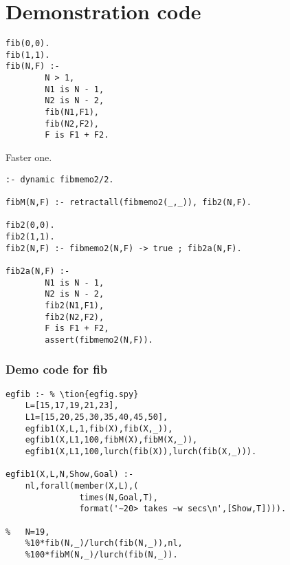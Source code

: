 \section{ Demonstration code
}
\label{sec:fibs}
\begin{Verbatim}
fib(0,0).
fib(1,1).
fib(N,F) :-
        N > 1,
        N1 is N - 1,
        N2 is N - 2,
        fib(N1,F1),     
        fib(N2,F2),
        F is F1 + F2.
\end{Verbatim}
Faster one.
\begin{Verbatim}
:- dynamic fibmemo2/2.

fibM(N,F) :- retractall(fibmemo2(_,_)), fib2(N,F).

fib2(0,0).
fib2(1,1).
fib2(N,F) :- fibmemo2(N,F) -> true ; fib2a(N,F).

fib2a(N,F) :- 
        N1 is N - 1,
        N2 is N - 2,
        fib2(N1,F1),    
        fib2(N2,F2),
        F is F1 + F2,
        assert(fibmemo2(N,F)).
\end{Verbatim}
\subsubsection{Demo code for fib
}
\begin{Verbatim}
egfib :- % \tion{egfig.spy}
	L=[15,17,19,21,23],
	L1=[15,20,25,30,35,40,45,50],
	egfib1(X,L,1,fib(X),fib(X,_)),
	egfib1(X,L1,100,fibM(X),fibM(X,_)),
	egfib1(X,L1,100,lurch(fib(X)),lurch(fib(X,_))).

egfib1(X,L,N,Show,Goal) :- 
	nl,forall(member(X,L),(
	           times(N,Goal,T),
	           format('~20> takes ~w secs\n',[Show,T]))).
	       
%	N=19,	
	%10*fib(N,_)/lurch(fib(N,_)),nl,
	%100*fibM(N,_)/lurch(fib(N,_)).
\end{Verbatim}
